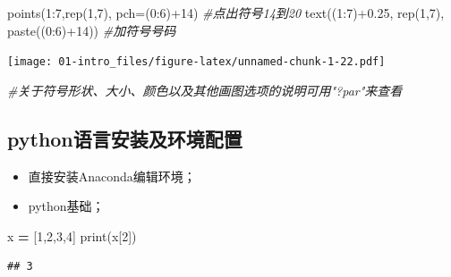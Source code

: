 \documentclass[
]{book}
\newenvironment{Shaded}{\begin{snugshade}}{\end{snugshade}}
\newcommand{\AttributeTok}[1]{\textcolor[rgb]{0.77,0.63,0.00}{#1}}
\newcommand{\BuiltInTok}[1]{#1}
\newcommand{\CommentTok}[1]{\textcolor[rgb]{0.56,0.35,0.01}{\textit{#1}}}
\newcommand{\DecValTok}[1]{\textcolor[rgb]{0.00,0.00,0.81}{#1}}
\newcommand{\FloatTok}[1]{\textcolor[rgb]{0.00,0.00,0.81}{#1}}
\newcommand{\FunctionTok}[1]{\textcolor[rgb]{0.00,0.00,0.00}{#1}}
\newcommand{\NormalTok}[1]{#1}
\newcommand{\OperatorTok}[1]{\textcolor[rgb]{0.81,0.36,0.00}{\textbf{#1}}}
\newcommand{\SpecialCharTok}[1]{\textcolor[rgb]{0.00,0.00,0.00}{#1}}
\providecommand{\tightlist}{%
  \setlength{\itemsep}{0pt}\setlength{\parskip}{0pt}}
\begin{document}
\begin{Shaded}
\begin{Highlighting}[]
\FunctionTok{points}\NormalTok{(}\DecValTok{1}\SpecialCharTok{:}\DecValTok{7}\NormalTok{,}\FunctionTok{rep}\NormalTok{(}\DecValTok{1}\NormalTok{,}\DecValTok{7}\NormalTok{), }\AttributeTok{pch=}\NormalTok{(}\DecValTok{0}\SpecialCharTok{:}\DecValTok{6}\NormalTok{)}\SpecialCharTok{+}\DecValTok{14}\NormalTok{) }\CommentTok{\#点出符号14到20}
\FunctionTok{text}\NormalTok{((}\DecValTok{1}\SpecialCharTok{:}\DecValTok{7}\NormalTok{)}\SpecialCharTok{+}\FloatTok{0.25}\NormalTok{, }\FunctionTok{rep}\NormalTok{(}\DecValTok{1}\NormalTok{,}\DecValTok{7}\NormalTok{), }\FunctionTok{paste}\NormalTok{((}\DecValTok{0}\SpecialCharTok{:}\DecValTok{6}\NormalTok{)}\SpecialCharTok{+}\DecValTok{14}\NormalTok{)) }\CommentTok{\#加符号号码}
\end{Highlighting}
\end{Shaded}

\texttt{[image: 01-intro\_files/figure-latex/unnamed-chunk-1-22.pdf]}

\begin{Shaded}
\begin{Highlighting}[]
\CommentTok{\#关于符号形状、大小、颜色以及其他画图选项的说明可用"?par"来查看}
\end{Highlighting}
\end{Shaded}

\hypertarget{pythonux8bedux8a00ux5b89ux88c5ux53caux73afux5883ux914dux7f6e}{%
\subsection{python语言安装及环境配置}\label{pythonux8bedux8a00ux5b89ux88c5ux53caux73afux5883ux914dux7f6e}}

\begin{itemize}
\tightlist
\item
  直接安装Anaconda编辑环境；
\item
  python基础；
\end{itemize}

\begin{Shaded}
\begin{Highlighting}[]
\NormalTok{x }\OperatorTok{=}\NormalTok{ [}\DecValTok{1}\NormalTok{,}\DecValTok{2}\NormalTok{,}\DecValTok{3}\NormalTok{,}\DecValTok{4}\NormalTok{]}
\BuiltInTok{print}\NormalTok{(x[}\DecValTok{2}\NormalTok{])}
\end{Highlighting}
\end{Shaded}

\begin{verbatim}
## 3
\end{verbatim}
\end{document}
